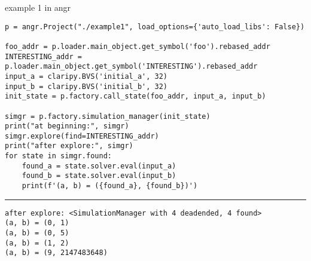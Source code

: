\begin{frame}[fragile]{example 1 in angr}
\begin{Verbatim}[fontsize=\fontsize{10}{11}]
p = angr.Project("./example1", load_options={'auto_load_libs': False})

foo_addr = p.loader.main_object.get_symbol('foo').rebased_addr
INTERESTING_addr = p.loader.main_object.get_symbol('INTERESTING').rebased_addr
input_a = claripy.BVS('initial_a', 32)
input_b = claripy.BVS('initial_b', 32)
init_state = p.factory.call_state(foo_addr, input_a, input_b)

simgr = p.factory.simulation_manager(init_state)
print("at beginning:", simgr)
simgr.explore(find=INTERESTING_addr)
print("after explore:", simgr)
for state in simgr.found:
    found_a = state.solver.eval(input_a)
    found_b = state.solver.eval(input_b)
    print(f'(a, b) = ({found_a}, {found_b})')
\end{Verbatim}
\hrule
\begin{Verbatim}[fontsize=\fontsize{10}{11}]
after explore: <SimulationManager with 4 deadended, 4 found>                                             
(a, b) = (0, 1)                                                                                          
(a, b) = (0, 5)                                                                                          
(a, b) = (1, 2)                                                                                          
(a, b) = (9, 2147483648)   
\end{Verbatim}
\end{frame}

